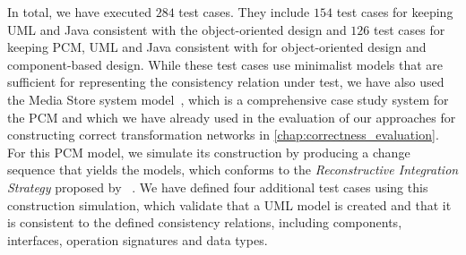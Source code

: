 In total, we have executed $284$ test cases.
They include $154$ test cases for keeping \gls{UML} and Java consistent with the object-oriented design \commonalities and $126$ test cases for keeping \gls{PCM}, \gls{UML} and Java consistent with \commonalities for object-oriented design and component-based design.
While these test cases use minimalist models that are sufficient for representing the consistency relation under test, we have also used the Media Store system model~\cite{strittmatter2016a}, which is a comprehensive case study system for the \gls{PCM} and which we have already used in the evaluation of our approaches for constructing correct transformation networks in \autoref{chap:correctness_evaluation}.
For this \gls{PCM} model, we simulate its construction by producing a change sequence that yields the models, which conforms to the \emph{Reconstructive Integration Strategy} proposed by \citeauthor{langhammer2017a}~\cite{langhammer2017a,klare2020Vitruv-JSS}.
We have defined four additional test cases using this construction simulation, which validate that a \gls{UML} model is created and that it is consistent to the defined consistency relations, including components, interfaces, operation signatures and data types.





